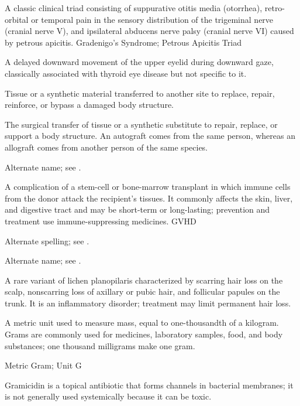 A classic clinical triad consisting of suppurative otitis media (otorrhea), retro-orbital or temporal pain in the sensory distribution of the trigeminal nerve (cranial nerve V), and ipsilateral abducens nerve palsy (cranial nerve VI) caused by petrous apicitis.
\synonyms
Gradenigo's Syndrome; Petrous Apicitis Triad

 A delayed downward movement of the upper eyelid during downward gaze, classically associated with thyroid eye disease but not specific to it.

 Tissue or a synthetic material transferred to another site to replace, repair, reinforce, or bypass a damaged body structure.

 The surgical transfer of tissue or a synthetic substitute to repair, replace, or support a body structure. An autograft comes from the same person, whereas an allograft comes from another person of the same species.

 Alternate name; see .

 A complication of a stem-cell or bone-marrow transplant in which immune cells from the donor attack the recipient’s tissues. It commonly affects the skin, liver, and digestive tract and may be short-term or long-lasting; prevention and treatment use immune-suppressing medicines.
\synonyms
GVHD

 Alternate spelling; see .

 Alternate name; see .

 A rare variant of lichen planopilaris characterized by scarring hair loss on the scalp, nonscarring loss of axillary or pubic hair, and follicular papules on the trunk. It is an inflammatory disorder; treatment may limit permanent hair loss.

 A metric unit used to measure mass, equal to one-thousandth of a kilogram. Grams are commonly used for medicines, laboratory samples, food, and body substances; one thousand milligrams make one gram.

\synonyms
Metric Gram; Unit G

 Gramicidin is a topical antibiotic that forms channels in bacterial membranes; it is not generally used systemically because it can be toxic.

